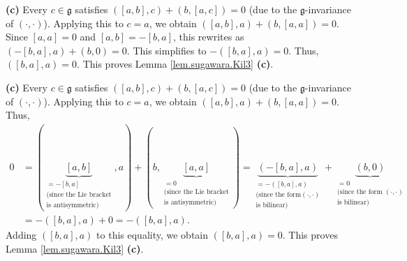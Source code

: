 \documentclass[etingof-lie.tex]{subfiles}
\begin{document}
\begin{vershort}
\textbf{(c)} Every $c\in\mathfrak{g}$ satisfies $\left(  \left[  a,b\right]
,c\right)  +\left(  b,\left[  a,c\right]  \right)  =0$ (due to the
$\mathfrak{g}$-invariance of $\left(  \cdot,\cdot\right)  $). Applying this to
$c=a$, we obtain $\left(  \left[  a,b\right]  ,a\right)  +\left(  b,\left[
a,a\right]  \right)  =0$. Since $\left[  a,a\right]  =0$ and $\left[
a,b\right]  =-\left[  b,a\right]  $, this rewrites as $\left(  -\left[
b,a\right]  ,a\right)  +\left(  b,0\right)  =0$. This simplifies to $-\left(
\left[  b,a\right]  ,a\right)  =0$. Thus, $\left(  \left[  b,a\right]
,a\right)  =0$. This proves Lemma \ref{lem.sugawara.Kil3} \textbf{(c)}.
\end{vershort}

\begin{verlong}
\textbf{(c)} Every $c\in\mathfrak{g}$ satisfies $\left(  \left[  a,b\right]
,c\right)  +\left(  b,\left[  a,c\right]  \right)  =0$ (due to the
$\mathfrak{g}$-invariance of $\left(  \cdot,\cdot\right)  $). Applying this to
$c=a$, we obtain $\left(  \left[  a,b\right]  ,a\right)  +\left(  b,\left[
a,a\right]  \right)  =0$. Thus,%
\begin{align*}
0  &  =\left(  \underbrace{\left[  a,b\right]  }_{\substack{=-\left[
b,a\right]  \\\text{(since the Lie bracket}\\\text{is antisymmetric)}%
}},a\right)  +\left(  b,\underbrace{\left[  a,a\right]  }%
_{\substack{=0\\\text{(since the Lie bracket}\\\text{is antisymmetric)}%
}}\right)  =\underbrace{\left(  -\left[  b,a\right]  ,a\right)  }%
_{\substack{=-\left(  \left[  b,a\right]  ,a\right)  \\\text{(since the form
}\left(  \cdot,\cdot\right)  \\\text{is bilinear)}}}+\underbrace{\left(
b,0\right)  }_{\substack{=0\\\text{(since the form }\left(  \cdot
,\cdot\right)  \\\text{is bilinear)}}}\\
&  =-\left(  \left[  b,a\right]  ,a\right)  +0=-\left(  \left[  b,a\right]
,a\right)  .
\end{align*}
Adding $\left(  \left[  b,a\right]  ,a\right)  $ to this equality, we obtain
$\left(  \left[  b,a\right]  ,a\right)  =0$. This proves Lemma
\ref{lem.sugawara.Kil3} \textbf{(c)}.
\end{verlong}
\end{document}
